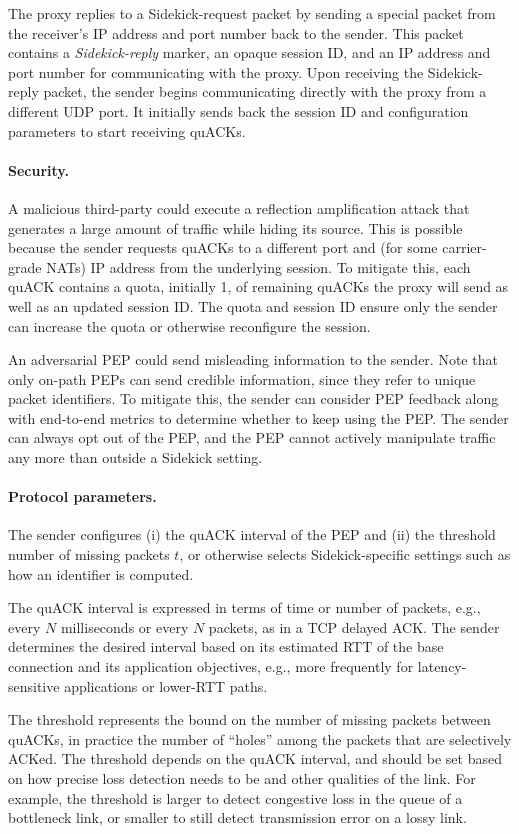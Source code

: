 The proxy replies to a Sidekick-request packet by sending a special packet
from the receiver's IP address and port number back to the sender.
This packet contains a \emph{Sidekick-reply} marker, an opaque session ID, and an
IP address and port number for communicating with the proxy.  Upon
receiving the Sidekick-reply packet, the sender begins communicating
directly with the proxy from a different UDP port.  It initially sends
back the session ID and configuration parameters to start receiving
quACKs.

\paragraph{Security.}
A malicious third-party could execute a reflection amplification attack that
generates a large amount of traffic while hiding its source. This is
possible because the sender requests quACKs to a different port and (for some
carrier-grade NATs) IP address from the underlying session. To mitigate this,
each quACK contains a quota, initially 1, of remaining quACKs the proxy will
send as well as an updated session ID\@.
The quota and session ID ensure only the sender can increase the quota or
otherwise reconfigure the session.

An adversarial PEP could send misleading information to the sender. Note that
only on-path PEPs can send credible information, since they refer to unique
packet identifiers.
To mitigate this, the sender can consider PEP feedback along with
end-to-end metrics to determine whether to keep using the PEP. The sender can
always opt out of the PEP, and the PEP cannot actively manipulate traffic any
more than outside a Sidekick setting.

\paragraph{Protocol parameters.}
The sender configures (i) the quACK interval of the PEP and (ii) the threshold
number of missing packets $t$, or otherwise selects Sidekick-specific settings
such as how an identifier is computed.

The quACK interval is expressed in terms of time or number of packets,
 e.g., every $N$ milliseconds or every $N$ packets, as in a TCP delayed ACK.
The sender determines the desired interval based on its estimated
RTT of the base connection and its application objectives, e.g.,
more frequently for latency-sensitive applications or lower-RTT paths.

The threshold represents the bound on the number of missing packets
between quACKs, in practice the number of ``holes'' among the packets that are
selectively ACKed. The threshold depends on the quACK interval, and
should be set based on how precise loss detection needs to be and
other qualities of the link.
For example, the threshold is larger to detect congestive loss in the queue of a
bottleneck link, or smaller to still detect transmission error on a lossy link.

